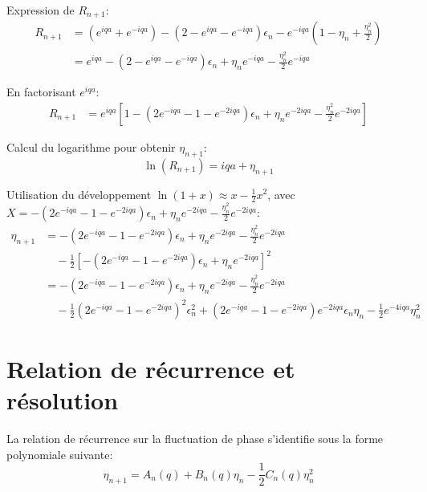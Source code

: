Expression de $R_{n+1}$:
\begin{align}
    R_{n+1} &= (e^{iqa} + e^{-iqa}) - (2 - e^{iqa} - e^{-iqa})\epsilon_n - e^{-iqa}\left(1 - \eta_n + \frac{\eta_n^2}{2}\right) \\
    &= e^{iqa} - (2 - e^{iqa} - e^{-iqa})\epsilon_n + \eta_n e^{-iqa} - \frac{\eta_n^2}{2} e^{-iqa}
\end{align}

En factorisant $e^{iqa}$:
\begin{align}
    R_{n+1} &= e^{iqa} \left[ 1 - (2e^{-iqa} - 1 - e^{-2iqa})\epsilon_n + \eta_n e^{-2iqa} - \frac{\eta_n^2}{2} e^{-2iqa} \right]
\end{align}

Calcul du logarithme pour obtenir $\eta_{n+1}$:
\begin{equation}
    \ln(R_{n+1}) = iqa + \eta_{n+1}
\end{equation}

Utilisation du développement $\ln(1+x) \approx x - \frac{1}{2}x^2$, avec $X = - (2e^{-iqa} - 1 - e^{-2iqa})\epsilon_n + \eta_n e^{-2iqa} - \frac{\eta_n^2}{2} e^{-2iqa}$:
\begin{align}
    \eta_{n+1} &= - (2e^{-iqa} - 1 - e^{-2iqa})\epsilon_n + \eta_n e^{-2iqa} - \frac{\eta_n^2}{2} e^{-2iqa} \nonumber \\
    &\quad - \frac{1}{2} {\left[ - (2e^{-iqa} - 1 - e^{-2iqa})\epsilon_n + \eta_n e^{-2iqa} \right]}^2 \\
    &= - (2e^{-iqa} - 1 - e^{-2iqa})\epsilon_n + \eta_n e^{-2iqa} - \frac{\eta_n^2}{2} e^{-2iqa} \nonumber \\
    &\quad - \frac{1}{2} {\left(2e^{-iqa} - 1 - e^{-2iqa}\right)}^2 \epsilon_n^2 + (2e^{-iqa} - 1 - e^{-2iqa})e^{-2iqa}\epsilon_n\eta_n - \frac{1}{2}e^{-4iqa}\eta_n^2
\end{align}

\section{Relation de récurrence et résolution}
La relation de récurrence sur la fluctuation de phase s'identifie sous la forme polynomiale suivante:
\begin{equation}
    \eta_{n+1} = A_n(q) + B_n(q) \eta_n - \frac{1}{2} C_n(q) \eta_n^2
\end{equation}

